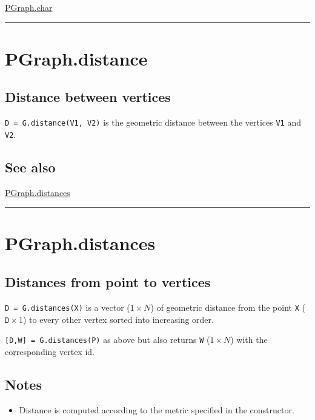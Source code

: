\hyperlink{PGraph.char}{\color{blue} PGraph.char}

\vspace{1.5ex}\hrule

\hypertarget{PGraph.distance}{\section*{PGraph.distance}}
\subsection*{Distance between vertices}


\texttt{D = G.distance(V1, V2)} is the geometric distance between
the vertices \texttt{V1} and \texttt{V2}.


\subsection*{See also}


\hyperlink{PGraph.distances}{\color{blue} PGraph.distances}

\vspace{1.5ex}\hrule

\hypertarget{PGraph.distances}{\section*{PGraph.distances}}
\subsection*{Distances from point to vertices}


\texttt{D = G.distances(X)} is a vector ($1 \times N$) of geometric distance from the point
\texttt{X} ($\texttt{D} \times 1$) to every other vertex sorted into increasing order.



\texttt{[D,W] = G.distances(P)} as above but also returns \texttt{W} ($1 \times N$) with the
corresponding vertex id.


\subsection*{Notes}
\begin{itemize}
  \item Distance is computed according to the metric specified in the    constructor.
\end{itemize}

